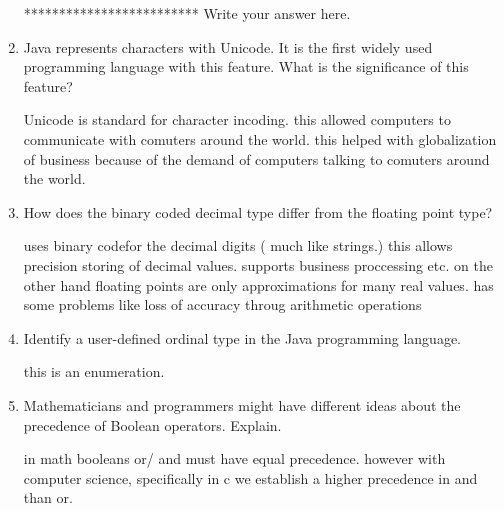 \begin{enumerate}
\begin{answer}
   ************************* Write your answer here.

    \end{answer}

  \item Java represents characters with Unicode. It is the first
    widely used programming language with this feature. What is the
    significance of this feature?

  \begin{answer}

  Unicode is standard for character incoding. this allowed computers to communicate with 
  comuters around the world. this helped with globalization of business because of the 
  demand of computers talking to comuters around the world.

    \end{answer}

  \item How does the binary coded decimal type differ from the
    floating point type?

  \begin{answer}

  uses binary codefor the decimal digits ( much like strings.) this allows precision 
  storing of decimal values. supports business proccessing etc.
  on the other hand floating points are only approximations for many real values. has 
  some problems like loss of accuracy throug arithmetic operations 

    \end{answer}

  \item Identify a user-defined ordinal type in the Java programming
    language.

  \begin{answer}

   this is an enumeration. 

    \end{answer}

  \item Mathematicians and programmers might have different ideas
    about the precedence of Boolean operators. Explain.

  \begin{answer}

   in math booleans or/ and must have equal precedence. 
   however with computer science, specifically in c we establish a higher precedence in
   and than or.

    \end{answer}


\end{enumerate}
